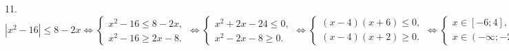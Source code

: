 11. $|x^2-16|\leqslant8-2x \Leftrightarrow \begin{cases} x^2-16\leqslant8-2x,\\ x^2-16\geqslant2x-8.\end{cases} \Leftrightarrow
\begin{cases} x^2+2x-24\leqslant0,\\ x^2-2x-8\geqslant0.\end{cases}\Leftrightarrow\begin{cases} (x-4)(x+6)\leqslant0,\\ (x-4)(x+2)\geqslant0.\end{cases}
\Leftrightarrow\begin{cases} x\in[-6;4],\\ x\in(-\infty;-2]\cup[4;+\infty).\end{cases}\Leftrightarrow x\in[-6;-2]\cup\{4\}.$\\
